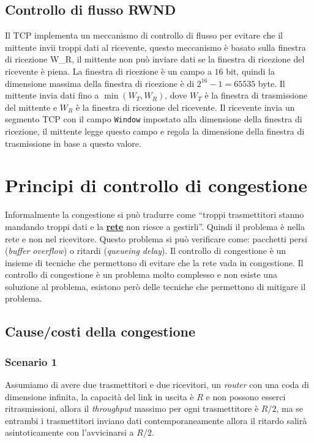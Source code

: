     \subsection[Controllo di flusso \texttt{RWND}]{Controllo di flusso \Acrshort*{RWND}}
        Il \Acrshort*{TCP} implementa un meccanismo di controllo di flusso per evitare che il mittente invii troppi dati al ricevente, questo meccanismo è basato sulla finestra di ricezione \Acrshort*{W_R}, il mittente non può inviare dati se la finestra di ricezione del ricevente è piena. La finestra di ricezione è un campo a $16$ bit, quindi la dimensione massima della finestra di ricezione è di $ 2^{16} - 1 = 65535 $ byte. Il mittente invia dati fino a $ \min(W_T, W_R) $, dove $ W_T $ è la finestra di trasmissione del mittente e $ W_R $ è la finestra di ricezione del ricevente. Il ricevente invia un segmento \Acrshort*{TCP} con il campo \texttt{Window} impostato alla dimensione della finestra di ricezione, il mittente legge questo campo e regola la dimensione della finestra di trasmissione in base a questo valore.
\section{Principi di controllo di congestione}
    Informalmente la congestione si può tradurre come ``troppi trasmettitori stanno mandando troppi dati e la \underline{\textbf{rete}} non riesce a gestirli''. Quindi il problema è nella rete e non nel ricevitore. Questo problema si può verificare come: pacchetti persi (\textit{buffer overflow}) o ritardi (\textit{queueing delay}). Il controllo di congestione è un insieme di tecniche che permettono di evitare che la rete vada in congestione. Il controllo di congestione è un problema molto complesso e non esiste una soluzione al problema, esistono però delle tecniche che permettono di mitigare il problema.
    \subsection{Cause/costi della congestione}
        \subsubsection{Scenario 1}
            Assumiamo di avere due trasmettitori e due ricevitori, un \textit{router} con una coda di dimensione infinita, la capacità del link in uscita è $ R $ e non possono esserci ritrasmissioni, allora il \textit{throughput} massimo per ogni trasmettitore è $ R/2 $, ma se entrambi i trasmettitori inviano dati contemporaneamente allora il ritardo salirà asintoticamente con l'avvicinarsi a $ R/2 $.
